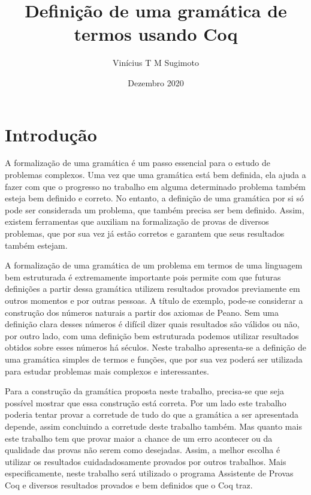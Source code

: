 \documentclass{article}
\title{Definição de uma gramática de termos usando Coq}
\author{Vinícius T M Sugimoto}
\date{Dezembro 2020}
\begin{document}
\maketitle

\section{Introdução}
\label{section:introducao}


A formalização de uma gramática é um passo essencial para o estudo de problemas complexos.
Uma vez que uma gramática está bem definida, ela ajuda a fazer com que o progresso no trabalho
em alguma determinado problema também esteja bem definido e correto. No entanto, a definição
de uma gramática por si só pode ser considerada um problema, que também precisa ser bem definido.
Assim, existem ferramentas que auxiliam na formalização de provas de diversos problemas, que por
sua vez já estão corretos e garantem que seus resultados também estejam.

A formalização de uma gramática de um problema em termos de uma linguagem bem estruturada é
extremamente importante pois permite com que futuras definições a partir dessa gramática utilizem
resultados provados previamente em outros momentos e por outras pessoas. A título de exemplo, pode-se
considerar a construção dos números naturais a partir dos axiomas de Peano. Sem uma definição clara
desses números é difícil dizer quais resultados são válidos ou não, por outro lado, com uma definição
bem estruturada podemos utilizar resultados obtidos sobre esses números há séculos. Neste trabalho
apresenta-se a definição de uma gramática simples de termos e funções, que por sua vez poderá ser
utilizada para estudar problemas mais complexos e interessantes.



Para a construção da gramática proposta neste trabalho, precisa-se que seja possível mostrar que essa
construção está correta. Por um lado este trabalho poderia tentar provar a corretude de tudo do que a
gramática a ser apresentada depende, assim concluindo a corretude deste trabalho também. Mas quanto
mais este trabalho tem que provar maior a chance de um erro acontecer ou da qualidade das provas não
serem como desejadas. Assim, a melhor escolha é utilizar os resultados cuidadadosamente provados por
outros trabalhos. Mais especificamente, neste trabalho será utilizado o programa Assistente de Provas
Coq e diversos resultados provados e bem definidos que o Coq traz.
\end{document}
